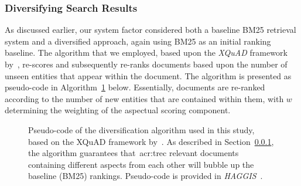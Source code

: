 \subsubsection{Diversifying Search Results}\label{sec:diversity:users:diversifying}
As discussed earlier, our system factor considered both a baseline BM25 retrieval system and a diversified approach, again using BM25 as an initial ranking baseline. The algorithm that we employed, based upon the \emph{XQuAD} framework by~\cite{santos2010query_reformulations_diversification}, re-scores and subsequently re-ranks documents based upon the number of unseen entities that appear within the document. The algorithm is presented as pseudo-code in Algorithm~\ref{alg:diversifying} below. Essentially, documents are re-ranked according to the number of new entities that are contained within them, with $w$ determining the weighting of the aspectual scoring component.

\renewcommand{\figurename}{Figure/Algorithm}
\begin{figure}[p!]
    \centering
    \caption[Diversification algorithm pseudo-code]{Pseudo-code of the diversification algorithm used in this study, based on the XQuAD framework by~\cite{santos2010query_reformulations_diversification}. As described in Section~\ref{sec:diversity:users:diversifying}, the algorithm guarantees that~\gls{acr:trec} relevant documents containing different aspects from each other will bubble up the baseline (BM25) rankings. Pseudo-code is provided in \emph{HAGGIS}~\citep{cutts2014haggis}.}
    \label{alg:diversifying}
\end{figure}
\renewcommand{\figurename}{Figure}


